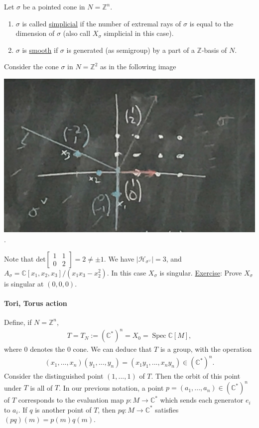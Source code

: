 \documentclass[a4paper,12pt]{amsart}
\newcommand{\ZZ}{\mathbb{Z}}
\newcommand{\CC}{\mathbb{C}}
\DeclareMathOperator{\Spec}{Spec}
\begin{document}
\begin{Def}
Let $\sigma$ be a pointed cone in $N = \ZZ^n$. 
\begin{enumerate}
	\item $\sigma$ is called \underline{simplicial} if the number of extremal rays of $\sigma$ is equal to the dimension of $\sigma$ (also call $X_\sigma$ simplicial in this case).
	\item $\sigma$ is \underline{smooth} if $\sigma$ is generated (as semigroup) by a part of a $\ZZ$-basis of $N$.
\end{enumerate}
\end{Def}

\begin{Eg}
Consider the cone $\sigma$ in $N = \ZZ^2$ as in the following image
\begin{center}
	\includegraphics[scale=0.4]{pic/toricvar_feb12_1}.
\end{center}
Note that det$\begin{bmatrix}
1 & 1 \\
0 & 2 
\end{bmatrix} = 2 \neq \pm 1$. We have $|\mathcal{H}_{\sigma^\vee}| = 3$, and $A_\sigma = \CC[x_1, x_2, x_3] / (x_1 x_3 - x_2^2)$. In this case $X_\sigma$ is singular. \underline{Exercise}: Prove $X_\sigma$ is singular at $(0,0,0)$.	
\end{Eg}


\paragraph{Tori, Torus action}
Define, if $N = \ZZ^n$, 
\begin{align*}
	T = T_N := (\CC^*)^n = X_0 = \Spec \CC[M],
\end{align*}
where $0$ denotes the $0$ cone. We can deduce that $T$ is a group, with the operation 
\begin{align*}
	(x_1, ..., x_n)(y_1, ..., y_n) = (x_1 y_1, ... , x_n y_n) \in (\CC^*)^n.
\end{align*}
Consider the distinguished point $(1, ..., 1)$ of $T$. Then the orbit of this point under $T$ is all of $T$. In our previous notation, a point $p = (a_1, ..., a_n) \in (\CC^*)^n$ of $T$ corresponds to the evaluation map $p: M \to \CC^*$ which sends each generator $e_i$ to $a_i$. If $q$ is another point of $T$, then $pq: M \to \CC^*$ satisfies $(pq)(m) = p(m) q(m)$. \\
\end{document}
